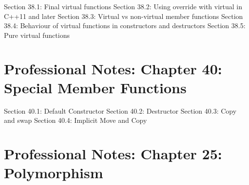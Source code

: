 Section 38.1: Final virtual functions Section 38.2: Using override with
virtual in C++11 and later Section 38.3: Virtual vs non-virtual member
functions Section 38.4: Behaviour of virtual functions in constructors
and destructors Section 38.5: Pure virtual functions

\hypertarget{professional-notes-chapter-40-special-member-functions}{%
\section{Professional Notes: Chapter 40: Special Member
Functions}\label{professional-notes-chapter-40-special-member-functions}}

Section 40.1: Default Constructor Section 40.2: Destructor Section 40.3:
Copy and swap Section 40.4: Implicit Move and Copy

\hypertarget{professional-notes-chapter-25-polymorphism-1}{%
\section{Professional Notes: Chapter 25:
Polymorphism}\label{professional-notes-chapter-25-polymorphism-1}}

